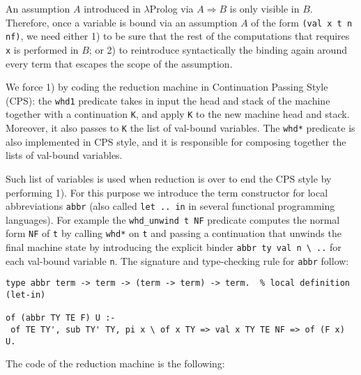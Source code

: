 An assumption $A$ introduced in $\lambda$Prolog via $A \Rightarrow B$ is only visible in $B$. Therefore, once a variable is bound via an assumption $A$ of the form \verb+(val x t n nf)+, we need either 1) to be sure that the rest of the computations that requires \verb+x+ is performed in $B$; or 2) to reintroduce syntactically the binding again around every term that escapes the scope of the assumption.

We force 1) by coding the reduction machine in Continuation Passing Style (CPS): the \verb+whd1+ predicate takes in input the head and stack of the machine together with a continuation \verb+K+, and apply \verb+K+ to the new machine head and stack. Moreover, it also passes to \verb+K+ the list of val-bound variables.
The \verb+whd*+ predicate is also implemented in CPS style, and it is responsible for composing together the lists of val-bound variables.

Such list of variables is used when reduction is over to end the CPS style by performing 1).  For this purpose we introduce the term constructor for local abbreviations \verb+abbr+ (also called \verb+let .. in+ in several functional programming languages).  For example the \verb+whd_unwind t NF+ predicate computes the normal form \verb+NF+ of \verb+t+ by calling \verb+whd*+ on \verb+t+ and passing a continuation that unwinds the final machine state by introducing the explicit binder \verb+abbr ty val n \ ..+ for each val-bound variable \verb+n+.  The signature and type-checking rule for \verb+abbr+ follow:

\begin{Verbatim}
type abbr term -> term -> (term -> term) -> term.  % local definition (let-in)

of (abbr TY TE F) U :-
 of TE TY', sub TY' TY, pi x \ of x TY => val x TY TE NF => of (F x) U.
\end{Verbatim}

The code of the reduction machine is the following:

